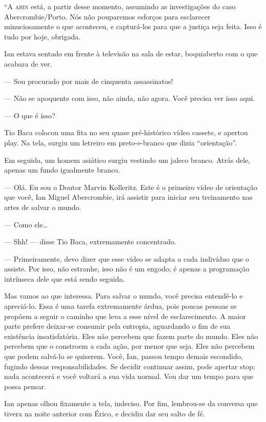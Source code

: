 “A \textsc{abin} está, a partir desse momento, assumindo as
investigações do caso Abercrombie/Porto. Nós não pouparemos esforços
para esclarecer minuciosamente o que aconteceu, e capturá-los para que a
justiça seja feita. Isso é tudo por hoje, obrigada.


Ian estava sentado em frente à televisão na sala de estar, boquiaberto
com o que acabara de ver.

--- Sou procurado por mais de cinquenta assassinatos!

--- Não se apoquente com isso, não ainda, não agora. Você precisa ver
isso aqui.

--- O que é isso?

Tio Baca colocou uma fita no seu quase pré-histórico vídeo cassete, e
apertou play. Na tela, surgiu um letreiro em preto-e-branco que dizia
“orientação”.

Em seguida, um homem asiático surgiu vestindo um jaleco branco. Atrás
dele, apenas um fundo igualmente branco.

--- Olá. Eu sou o Doutor Marvin Kolleritz. Este é o primeiro vídeo de
orientação que você, Ian Miguel Abercrombie, irá assistir para iniciar
seu treinamento nas artes de salvar o mundo.

--- Como ele\ldots

--- Shh! --- disse Tio Baca, extremamente concentrado.

--- Primeiramente, devo dizer que esse vídeo se adapta a cada indivíduo
que o assiste. Por isso, não estranhe, isso não é um engodo; é apenas a
programação intrínseca dele que está sendo seguida.

Mas vamos ao que interessa. Para salvar o mundo, você precisa entendê-lo
e apreciá-lo. Essa é uma tarefa extremamente árdua, pois poucas pessoas
se propõem a seguir o caminho que leva a esse nível de esclarecimento. A
maior parte prefere deixar-se consumir pela entropia, aguardando o fim
de sua existência insatisfatória. Eles não percebem que fazem parte do
mundo. Eles não percebem que o constroem a cada ação, por menor que
seja. Eles não percebem que podem salvá-lo se quiserem. Você, Ian,
passou tempo demais escondido, fugindo dessas responsabilidades. Se
decidir continuar assim, pode apertar stop; nada acontecerá e você
voltará a sua vida normal. Vou dar um tempo para que possa pensar.

Ian apenas olhou fixamente a tela, indeciso. Por fim, lembrou-se da
conversa que tivera na noite anterior com Érico, e decidiu dar seu salto
de fé.

